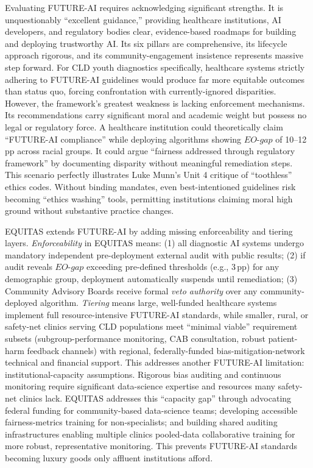 \documentclass[11pt,twoside]{article}
\DeclareRobustCommand{\EOgap}{EO\text{-}gap\xspace}
\DeclareRobustCommand{\pp}{pp\xspace} %
\begin{document}
Evaluating FUTURE-AI requires acknowledging significant strengths. It is unquestionably ``excellent guidance,'' providing healthcare institutions, AI developers, and regulatory bodies clear, evidence-based roadmaps for building and deploying trustworthy AI. Its six pillars are comprehensive, its lifecycle approach rigorous, and its community-engagement insistence represents massive step forward. For CLD youth diagnostics specifically, healthcare systems strictly adhering to FUTURE-AI guidelines would produce far more equitable outcomes than status quo, forcing confrontation with currently-ignored disparities. However, the framework's greatest weakness is lacking enforcement mechanisms. Its recommendations carry significant moral and academic weight but possess no legal or regulatory force. A healthcare institution could theoretically claim ``FUTURE-AI compliance'' while deploying algorithms showing $\EOgap$ of 10--12\,\pp across racial groups. It could argue ``fairness addressed through regulatory framework'' by documenting disparity without meaningful remediation steps. This scenario perfectly illustrates Luke Munn's Unit 4 critique of ``toothless'' ethics codes. Without binding mandates, even best-intentioned guidelines risk becoming ``ethics washing'' tools, permitting institutions claiming moral high ground without substantive practice changes.

\textsc{EQUITAS} extends FUTURE-AI by adding missing enforceability and tiering layers. \textit{Enforceability} in \textsc{EQUITAS} means: (1) all diagnostic AI systems undergo mandatory independent pre-deployment external audit with public results; (2) if audit reveals $\EOgap$ exceeding pre-defined thresholds (e.g., 3\,\pp) for any demographic group, deployment automatically suspends until remediation; (3) Community Advisory Boards receive formal \textit{veto authority} over any community-deployed algorithm. \textit{Tiering} means large, well-funded healthcare systems implement full resource-intensive FUTURE-AI standards, while smaller, rural, or safety-net clinics serving CLD populations meet ``minimal viable'' requirement subsets (subgroup-performance monitoring, CAB consultation, robust patient-harm feedback channels) with regional, federally-funded bias-mitigation-network technical and financial support. This addresses another FUTURE-AI limitation: institutional-capacity assumptions. Rigorous bias auditing and continuous monitoring require significant data-science expertise and resources many safety-net clinics lack. \textsc{EQUITAS} addresses this ``capacity gap'' through advocating federal funding for community-based data-science teams; developing accessible fairness-metrics training for non-specialists; and building shared auditing infrastructures enabling multiple clinics pooled-data collaborative training for more robust, representative monitoring. This prevents FUTURE-AI standards becoming luxury goods only affluent institutions afford.
\end{document}
